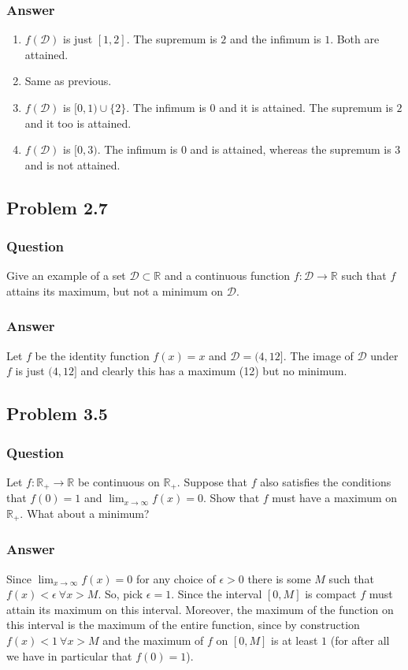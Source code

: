 \documentclass[12pt]{article}
\begin{document}
\subsubsection{Answer}
\begin{enumerate}
\item $f(\mathcal{D})$ is just $[1,2]$. The supremum is $2$ and the infimum is $1$. Both are attained.
\item Same as previous.
\item $f(\mathcal{D})$ is $[0,1) \cup \{2\}$. The infimum is $0$ and it is attained. The supremum is $2$ and it too is attained.
\item $f(\mathcal{D})$ is $[0,3)$. The infimum is $0$ and is attained, whereas the supremum is $3$ and is not attained.
\end{enumerate}


\subsection{Problem 2.7}
\subsubsection{Question}
Give an example of a set $\mathcal{D} \subset \mathbb{R}$ and a continuous function $f:\mathcal{D} \to \mathbb{R}$ such that $f$ attains its maximum, but not a minimum on $\mathcal{D}$.
\subsubsection{Answer}
Let $f$ be the identity function $f(x)=x$ and $\mathcal{D} = (4,12]$. The image of $\mathcal{D}$ under $f$ is just $(4,12]$ and clearly this has a maximum (12) but no minimum.

\subsection{Problem 3.5}
\subsubsection{Question}
Let $f:\mathbb{R}_+ \to \mathbb{R}$ be continuous on $\mathbb{R}_+$. Suppose that $f$ also satisfies the conditions that $f(0) = 1$ and $\lim_{x\to \infty} f(x)=0$. Show that $f$ must have a maximum on $\mathbb{R}_+$. What about a minimum?
\subsubsection{Answer}
Since $\lim_{x\to \infty} f(x)=0$ for any choice of $\epsilon >0$ there is some $M$ such that $f(x)<\epsilon\ \forall x > M$. So, pick $\epsilon = 1$. Since the interval $[0,M]$ is compact $f$ must attain its maximum on this interval. Moreover, the maximum of the function on this interval is the maximum of the entire function, since by construction $f(x)<1\ \forall x > M$ and the maximum of $f$ on $[0,M]$ is at least $1$ (for after all we have in particular that $f(0)=1$).
\end{document}
